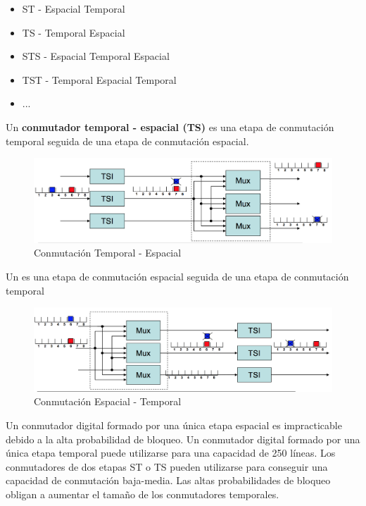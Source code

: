 \documentclass[10pt,portrait, twocolumn]{article}
\begin{document}
	\begin{itemize}
		\item ST - Espacial Temporal
		\item TS - Temporal Espacial
		\item STS - Espacial Temporal Espacial
		\item TST - Temporal Espacial Temporal
		\item ...
	\end{itemize}
	
Un \textbf{conmutador temporal - espacial (TS)} es una etapa de conmutación temporal seguida de una etapa de conmutación espacial.	
	
	\begin{figure}[!ht]
 		\centering
  		 \includegraphics[scale = 0.4]{images/TS}
		\caption{Conmutación Temporal - Espacial}
	\end{figure}
	
Un  es una etapa de conmutación espacial seguida de una etapa de conmutación temporal
	
	\begin{figure}[!ht]
 		\centering
  		 \includegraphics[scale = 0.4]{images/ST}
		\caption{Conmutación Espacial - Temporal}
	\end{figure}

Un conmutador digital formado por una única etapa espacial es impracticable debido a la alta probabilidad de bloqueo. Un conmutador digital formado por una única etapa temporal puede utilizarse para una capacidad de 250 líneas. Los conmutadores de dos etapas ST o TS pueden utilizarse para conseguir una capacidad de conmutación baja-media. Las altas probabilidades de bloqueo obligan a aumentar el tamaño de los conmutadores temporales.\\
\end{document}

